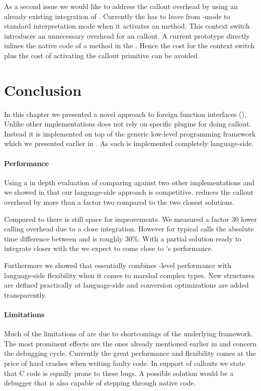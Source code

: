 As a second issue we would like to address the callout overhead by using an already existing \JIT integration of \NB.
Currently the \VM has to leave from \JIT-mode to standard interpretation mode when it activates an \NB method.
This context switch introduces an unnecessary overhead for an \FFI callout.
A current prototype directly inlines the native code of a \NB method in the \JIT.
Hence the cost for the context switch plus the cost of activating the \NB callout primitive can be avoided.


\section{Conclusion}
In this chapter we presented \NB a novel approach to foreign function interfaces (\FFI).
Unlike other implementations \NB does not rely on specific plugins for doing \FFI callout. 
Instead it is implemented on top of the generic low-level programming framework \B which we presented earlier in .
As such \NB is implemented completely language-side.

\paragraph{\NB Performance}
Using a in depth evaluation of \NB comparing against two other \ST \FFI implementations and \LuaJIT we showed in  that our language-side approach is competitive.
\NB reduces the callout overhead by more than a factor two compared to the two closest \ST solutions.

Compared to \LuaJIT there is still space for improvements.
We measured a factor 30 lower calling overhead due to a close \JIT integration.
However for typical \FFI calls the absolute time difference between \NB and \Lua is roughly $30\%$.
With a partial solution ready to integrate \NB closer with the \JIT we expect to come close to \Lua's performance.

Furthermore we showed that \NB essentially combines \VM-level performance with language-side flexibility when it comes to marshal complex types.
New structures are defined practically at language-side and conversion optimizations are added transparently.

\paragraph{\NB Limitations}
Much of the limitations of \NB are due to shortcomings of the underlying \B framework.
The most prominent effects are the ones already mentioned earlier in  and concern the debugging cycle.
Currently the great performance and flexibility comes at the price of hard crashes when writing faulty code.
In support of \NB callouts we state that C code is equally prone to these bugs.
A possible solution would be a debugger that is also capable of stepping through native code.

